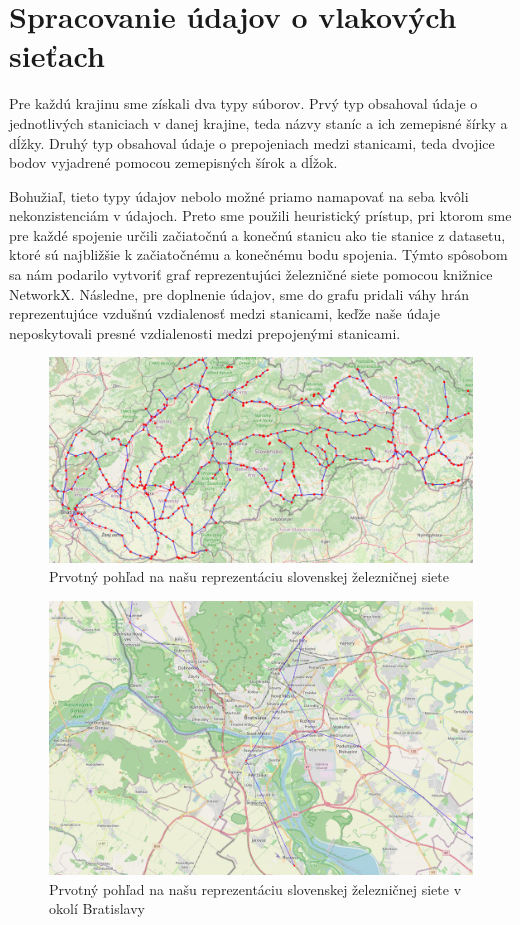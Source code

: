 \documentclass[main.tex]{subfiles}
\begin{document}
	
\section{Spracovanie údajov o vlakových sieťach}

Pre každú krajinu sme získali dva typy súborov. Prvý typ obsahoval údaje o jednotlivých staniciach v danej krajine, teda názvy staníc a ich zemepisné šírky a dĺžky. Druhý typ obsahoval údaje o prepojeniach medzi stanicami, teda dvojice bodov vyjadrené pomocou zemepisných šírok a dĺžok.

Bohužiaľ, tieto typy údajov nebolo možné priamo namapovať na seba kvôli nekonzistenciám v údajoch. Preto sme použili heuristický prístup, pri ktorom sme pre každé spojenie určili začiatočnú a konečnú stanicu ako tie stanice z datasetu, ktoré sú najbližšie k začiatočnému a konečnému bodu spojenia. Týmto spôsobom sa nám podarilo vytvoriť graf reprezentujúci železničné siete pomocou knižnice NetworkX. Následne, pre doplnenie údajov, sme do grafu pridali váhy hrán reprezentujúce vzdušnú vzdialenosť medzi stanicami, keďže naše údaje neposkytovali presné vzdialenosti medzi prepojenými stanicami.

\begin{figure}
\centerline{\includegraphics[width=1\textwidth]{images/first_attempt_slovakia.png}}
\caption{Prvotný pohľad na našu reprezentáciu slovenskej železničnej siete}
\label{obr:Slovakia_first}
\end{figure}

\begin{figure}
\centerline{\includegraphics[width=1\textwidth]{images/first_attempt_bratislava.png}}
\caption{Prvotný pohľad na našu reprezentáciu slovenskej železničnej siete v okolí Bratislavy}
\label{obr:Bratislava_first}
\end{figure}
\end{document}
